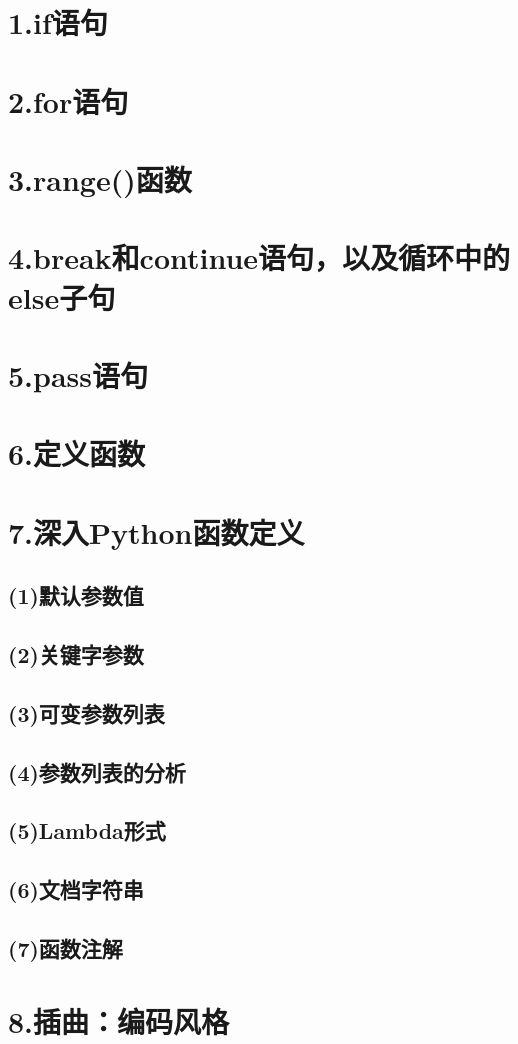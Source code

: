 \documentclass{article}
\begin{document}
\begin{CJK}{UTF8}{gbsn}
\section*{1.if语句}
\section*{2.for语句}
\section*{3.range()函数}
\section*{4.break和continue语句，以及循环中的else子句}
\section*{5.pass语句}
\section*{6.定义函数}
\section*{7.深入Python函数定义}
\subsection*{(1)默认参数值}
\subsection*{(2)关键字参数}
\subsection*{(3)可变参数列表}
\subsection*{(4)参数列表的分析}
\subsection*{(5)Lambda形式}
\subsection*{(6)文档字符串}
\subsection*{(7)函数注解}
\section*{8.插曲：编码风格}
\end{CJK}
\end{document}
